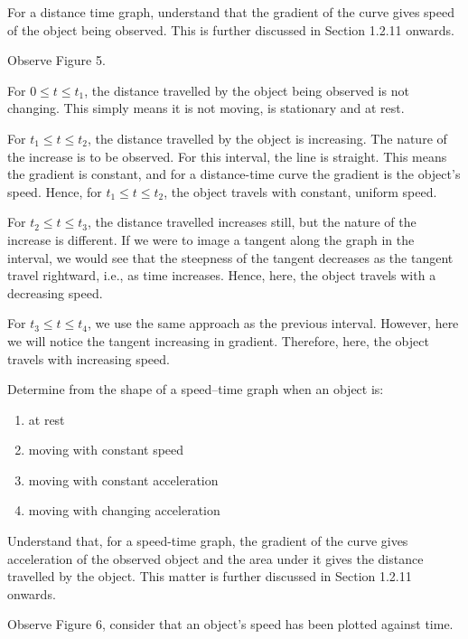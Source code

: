 For a distance time graph, understand that the gradient of the curve gives speed of the object
being observed. This is further discussed in Section 1.2.11 onwards.

\smallskip
Observe Figure 5. 

For $ 0 \le t \le t_1$, the distance travelled by the object being observed is not changing. This
simply means it is not moving, is stationary and at rest.

For $ t_1 \le t \le t_2$, the distance travelled by the object is increasing. The nature of the
increase is to be observed. For this interval, the line is straight. This means the gradient is
constant, and for a distance-time curve the gradient is the object's speed. Hence, for 
$ t_1 \le t \le t_2 $, the object travels with constant, uniform speed.

For $t_2 \le t \le t_3$, the distance travelled increases still, but the nature of the increase
is different. If we were to image a tangent along the graph in the interval, we would see that
the steepness of the tangent decreases as the tangent travel rightward, i.e., as time increases.
Hence, here, the object travels with a decreasing speed.

For $t_3 \le t \le t_4$, we use the same approach as the previous interval. However, here we will
notice the tangent increasing in gradient. Therefore, here, the object travels with increasing
speed.

\begin{point}
Determine from the shape of a speed–time graph when an object is:
\begin{enumerate}[label=(\alph*)]
	\setlength\itemsep{0em}
	\item at rest
	\item moving with constant speed
	\item moving with constant acceleration
	\item moving with changing acceleration
\end{enumerate}
\end{point}

Understand that, for a speed-time graph, the gradient of the curve gives acceleration of the
observed object and the area under it gives the distance travelled by the object. This matter
is further discussed in Section 1.2.11 onwards.

\smallskip
Observe Figure 6, consider that an object's speed has been plotted against time.

